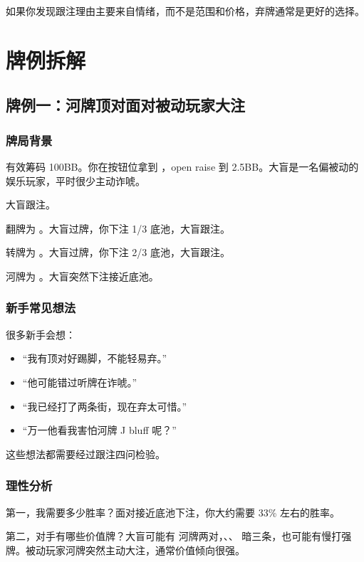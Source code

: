 如果你发现跟注理由主要来自情绪，而不是范围和价格，弃牌通常是更好的选择。

\section{牌例拆解}

\subsection{牌例一：河牌顶对面对被动玩家大注}

\subsubsection*{牌局背景}

有效筹码 100BB。你在按钮位拿到 ，open raise 到 2.5BB。大盲是一名偏被动的娱乐玩家，平时很少主动诈唬。

大盲跟注。

翻牌为 。大盲过牌，你下注 1/3 底池，大盲跟注。

转牌为 。大盲过牌，你下注 2/3 底池，大盲跟注。

河牌为 。大盲突然下注接近底池。

\subsubsection*{新手常见想法}

很多新手会想：

\begin{itemize}
\item “我有顶对好踢脚，不能轻易弃。”
\item “他可能错过听牌在诈唬。”
\item “我已经打了两条街，现在弃太可惜。”
\item “万一他看我害怕河牌 J bluff 呢？”
\end{itemize}

这些想法都需要经过跟注四问检验。

\subsubsection*{理性分析}

第一，我需要多少胜率？面对接近底池下注，你大约需要 33\% 左右的胜率。

第二，对手有哪些价值牌？大盲可能有  河牌两对，、、 暗三条，也可能有慢打强牌。被动玩家河牌突然主动大注，通常价值倾向很强。

